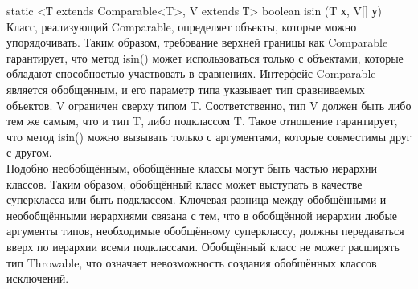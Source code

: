 static <Т extends Comparable<T>, V extends Т> boolean isin (T х, V[] у) {\\
Класс, реализующий Comparable, определяет объекты, которые можно упорядочивать. Таким образом, требование верхней границы как Comparable гарантирует, что метод isin() может использоваться только с объектами, которые обладают способностью участвовать в сравнениях. Интерфейс Comparable является обобщенным, и его параметр типа указывает тип сравниваемых объектов. V ограничен сверху типом T. Соответственно, тип V должен быть либо тем же самым, что и тип T, либо подклассом T. Такое отношение гарантирует, что метод isin() можно вызывать только с аргументами, которые совместимы друг с другом. \\
Подобно необобщённым, обобщённые классы могут быть частью иерархии классов. Таким образом, обобщённый класс может выступать в качестве суперкласса или быть подклассом. Ключевая разница между обобщёнными и необобщёнными иерархиями связана с тем, что в обобщённой иерархии любые аргументы типов, необходимые обобщённому суперклассу, должны передаваться вверх по иерархии всеми подклассами. Обобщённый класс не может расширять тип Throwable, что означает
невозможность создания обобщённых классов исключений. 
}
